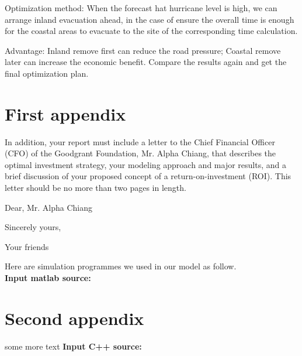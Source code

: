 \documentclass{mcmthesis}
\begin{document}
Optimization method: When the forecast hat hurricane level is high, we can arrange inland evacuation ahead, in the case of ensure the overall time is enough for the coastal areas to evacuate to the site of the corresponding time calculation.

Advantage: Inland remove first can reduce the road pressure; Coastal remove later can increase the economic benefit. Compare the results again and get the final optimization plan.




\begin{appendices}

\section{First appendix}

In addition, your report must include a letter to the Chief Financial Officer (CFO) of the Goodgrant Foundation, Mr. Alpha Chiang, that describes the optimal investment strategy, your modeling approach and major results, and a brief discussion of your proposed concept of a return-on-investment (ROI). This letter should be no more than two pages in length.

\begin{letter}{Dear, Mr. Alpha Chiang}

\lipsum[1-2]

\vspace{\parskip}

Sincerely yours,

Your friends

\end{letter}
Here are simulation programmes we used in our model as follow.\\

\textbf{\textcolor[rgb]{0.98,0.00,0.00}{Input matlab source:}}


\section{Second appendix}

some more text \textcolor[rgb]{0.98,0.00,0.00}{\textbf{Input C++ source:}}


\end{appendices}
\end{document}
